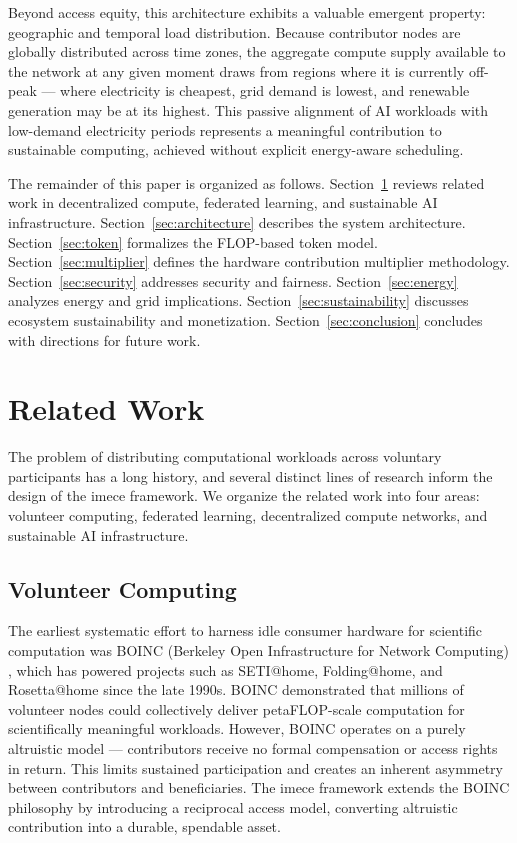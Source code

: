 \documentclass[12pt]{article}
\begin{document}
Beyond access equity, this architecture exhibits a valuable emergent property: geographic and temporal load distribution. Because contributor nodes are globally distributed across time zones, the aggregate compute supply available to the network at any given moment draws from regions where it is currently off-peak — where electricity is cheapest, grid demand is lowest, and renewable generation may be at its highest. This passive alignment of AI workloads with low-demand electricity periods represents a meaningful contribution to sustainable computing, achieved without explicit energy-aware scheduling.

The remainder of this paper is organized as follows. Section~\ref{sec:related} reviews related work in decentralized compute, federated learning, and sustainable AI infrastructure. Section~\ref{sec:architecture} describes the system architecture. Section~\ref{sec:token} formalizes the FLOP-based token model. Section~\ref{sec:multiplier} defines the hardware contribution multiplier methodology. Section~\ref{sec:security} addresses security and fairness. Section~\ref{sec:energy} analyzes energy and grid implications. Section~\ref{sec:sustainability} discusses ecosystem sustainability and monetization. Section~\ref{sec:conclusion} concludes with directions for future work.

\section{Related Work}
\label{sec:related}

The problem of distributing computational workloads across voluntary participants has a long history, and several distinct lines of research inform the design of the imece framework. We organize the related work into four areas: volunteer computing, federated learning, decentralized compute networks, and sustainable AI infrastructure.

\subsection{Volunteer Computing}

The earliest systematic effort to harness idle consumer hardware for scientific computation was BOINC (Berkeley Open Infrastructure for Network Computing) \cite{anderson2004boinc}, which has powered projects such as SETI@home, Folding@home, and Rosetta@home since the late 1990s. BOINC demonstrated that millions of volunteer nodes could collectively deliver petaFLOP-scale computation for scientifically meaningful workloads. However, BOINC operates on a purely altruistic model — contributors receive no formal compensation or access rights in return. This limits sustained participation and creates an inherent asymmetry between contributors and beneficiaries. The imece framework extends the BOINC philosophy by introducing a reciprocal access model, converting altruistic contribution into a durable, spendable asset.
\end{document}
